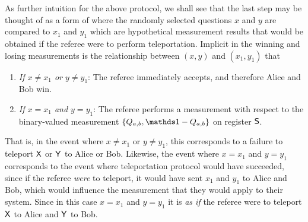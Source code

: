 As further intuition for the above protocol, we shall see that the last step may be thought of as a form of  where the randomly selected questions $x$ and $y$ are compared to $x_1$ and $y_1$ which are hypothetical measurement results that would be obtained if the referee were to perform teleportation. Implicit in the winning and losing measurements is the relationship between $(x,y)$ and $(x_1,y_1)$ that
\begin{enumerate}
		\item \emph{If $x \not= x_1$ or $y \not= y_1$}: The referee immediately accepts, and therefore Alice and Bob win. 
		\item \emph{If $x = x_1$ and $y = y_1$}: The referee performs a measurement with respect to the binary-valued measurement $\{Q_{a,b}, \I - Q_{a,b} \}$ on register $\mathsf{S}$.
	\end{enumerate}
That is, in the event where $x \not= x_1$ or $y \not= y_1$, this corresponds to a failure to teleport $\mathsf{X}$ or $\mathsf{Y}$ to Alice or Bob. Likewise, the event where $x = x_1$ and $y = y_1$ corresponds to the event where teleportation protocol would have succeeded, since if the referee \emph{were} to teleport, it would have sent $x_1$ and $y_1$ to Alice and Bob, which would influence the measurement that they would apply to their system. Since in this case $x = x_1$ and $y = y_1$ it is \emph{as if} the referee were to teleport $\mathsf{X}$ to Alice and $\mathsf{Y}$ to Bob.

